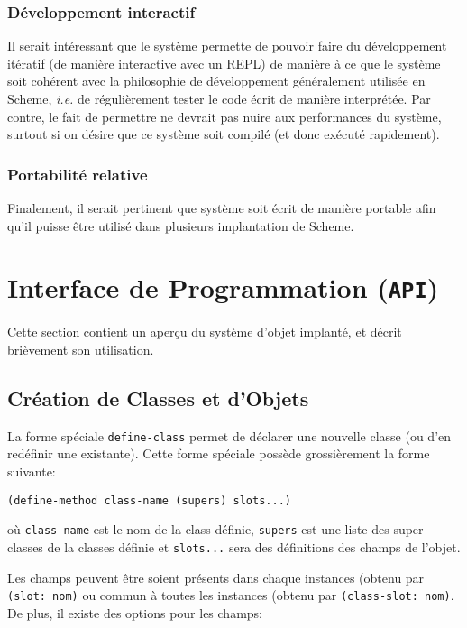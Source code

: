     \subsubsection{Développement interactif}
      Il serait intéressant que le système permette de pouvoir faire
      du développement itératif (de manière interactive avec un REPL)
      de manière à ce que le système soit cohérent avec la philosophie
      de développement généralement utilisée en Scheme, \textit{i.e.}
      de régulièrement tester le code écrit de manière interprétée.
      Par contre, le fait de permettre ne devrait pas nuire aux
      performances du système, surtout si on désire que ce système
      soit compilé (et donc exécuté rapidement).

    \subsubsection{Portabilité relative}
      Finalement, il serait pertinent que système soit écrit de
      manière portable afin qu'il puisse être utilisé dans plusieurs
      implantation de Scheme. 


  \section{Interface de Programmation (\texttt{API})}
    \label{api}

    Cette section contient un aperçu du système d'objet implanté, et
    décrit brièvement son utilisation.
  
    \subsection{Création de Classes et d'Objets}
      La forme spéciale \texttt{define-class} permet de déclarer une
      nouvelle classe (ou d'en redéfinir une existante). Cette forme
      spéciale possède grossièrement la forme suivante:

      \begin{lstlisting}
(define-method class-name (supers) slots...)
      \end{lstlisting}

      où \texttt{class-name} est le nom de la class définie,
      \texttt{supers} est une liste des super-classes de la classes
      définie et \texttt{slots...} sera des définitions des champs de
      l'objet.

      Les champs peuvent être soient présents dans chaque instances
      (obtenu par \texttt{(slot: nom)} ou commun à toutes les
      instances (obtenu par \texttt{(class-slot: nom)}. De plus, il
      existe des options pour les champs:
      
